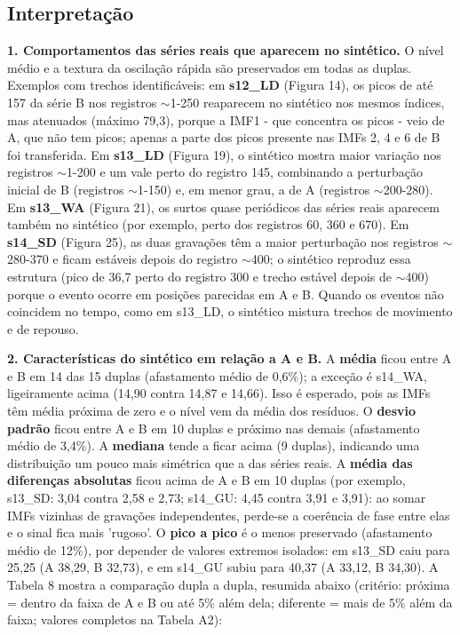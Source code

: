 \subsection{Interpretação}

\textbf{1. Comportamentos das séries reais que aparecem no sintético.} O nível médio e a textura da oscilação rápida são preservados em todas as duplas. Exemplos com trechos identificáveis: em \textbf{s12\_LD} (Figura 14), os picos de até 157 da série B nos registros $\sim$1-250 reaparecem no sintético nos mesmos índices, mas atenuados (máximo 79,3), porque a IMF1 - que concentra os picos - veio de A, que não tem picos; apenas a parte dos picos presente nas IMFs 2, 4 e 6 de B foi transferida. Em \textbf{s13\_LD} (Figura 19), o sintético mostra maior variação nos registros $\sim$1-200 e um vale perto do registro 145, combinando a perturbação inicial de B (registros $\sim$1-150) e, em menor grau, a de A (registros $\sim$200-280). Em \textbf{s13\_WA} (Figura 21), os surtos quase periódicos das séries reais aparecem também no sintético (por exemplo, perto dos registros 60, 360 e 670). Em \textbf{s14\_SD} (Figura 25), as duas gravações têm a maior perturbação nos registros $\sim$280-370 e ficam estáveis depois do registro $\sim$400; o sintético reproduz essa estrutura (pico de 36,7 perto do registro 300 e trecho estável depois de $\sim$400) porque o evento ocorre em posições parecidas em A e B. Quando os eventos não coincidem no tempo, como em s13\_LD, o sintético mistura trechos de movimento e de repouso.

\textbf{2. Características do sintético em relação a A e B.} A \textbf{média} ficou entre A e B em 14 das 15 duplas (afastamento médio de 0,6\%); a exceção é s14\_WA, ligeiramente acima (14,90 contra 14,87 e 14,66). Isso é esperado, pois as IMFs têm média próxima de zero e o nível vem da média dos resíduos. O \textbf{desvio padrão} ficou entre A e B em 10 duplas e próximo nas demais (afastamento médio de 3,4\%). A \textbf{mediana} tende a ficar acima (9 duplas), indicando uma distribuição um pouco mais simétrica que a das séries reais. A \textbf{média das diferenças absolutas} ficou acima de A e B em 10 duplas (por exemplo, s13\_SD: 3,04 contra 2,58 e 2,73; s14\_GU: 4,45 contra 3,91 e 3,91): ao somar IMFs vizinhas de gravações independentes, perde-se a coerência de fase entre elas e o sinal fica mais 'rugoso'. O \textbf{pico a pico} é o menos preservado (afastamento médio de 12\%), por depender de valores extremos isolados: em s13\_SD caiu para 25,25 (A 38,29, B 32,73), e em s14\_GU subiu para 40,37 (A 33,12, B 34,30). A Tabela 8 mostra a comparação dupla a dupla, resumida abaixo (critério: próxima = dentro da faixa de A e B ou até 5\% além dela; diferente = mais de 5\% além da faixa; valores completos na Tabela A2):

